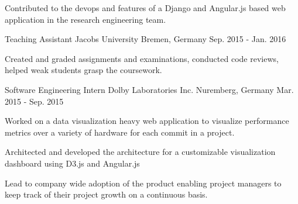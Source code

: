\begin{cventries}
{\begin{cvitems}
      \item {Contributed to the devops and features of a Django and Angular.js based web application in the research engineering team.}
    \end{cvitems} 
  }
\cventry
  {Teaching Assistant} %
  {Jacobs University} %
  {Bremen, Germany} %
  {Sep. 2015 - Jan. 2016} %
  {
    \begin{cvitems} %
      \item {Created and graded assignments and examinations, conducted code reviews, helped weak students grasp the coursework.}
    \end{cvitems} 
  }
  \cventry
    {Software Engineering Intern} %
    {Dolby Laboratories Inc.} %
    {Nuremberg, Germany} %
    {Mar. 2015 - Sep. 2015} %
    {
      \begin{cvitems} %
        \item {Worked on a data visualization heavy web application to visualize performance metrics over a variety of hardware for each commit in a project.}
        \item {Architected and developed the architecture for a customizable visualization dashboard using D3.js and Angular.js}
        \item {Lead to company wide adoption of the product enabling project managers to keep track of their project growth on a continuous basis.}
      \end{cvitems}
    }

\end{cventries}
